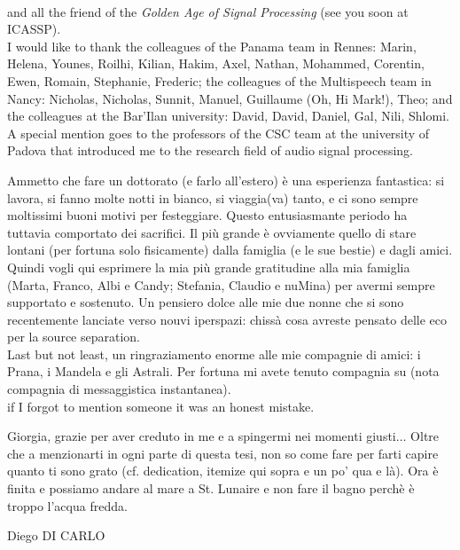 \\and all the friend of the \textit{Golden Age of Signal Processing} (see you soon at ICASSP).
\\I would like to thank the colleagues of the Panama team in Rennes: Marin, Helena, Younes, Roilhi, Kilian, Hakim, Axel, Nathan, Mohammed, Corentin, Ewen, Romain, Stephanie, Frederic;
the colleagues of the Multispeech team in Nancy: Nicholas, Nicholas, Sunnit, Manuel, Guillaume (Oh, Hi Mark!), Theo;
and the colleagues at the Bar'Ilan university: David, David, Daniel, Gal, Nili, Shlomi.
A special mention goes to the professors of the CSC team at the university of Padova that introduced me to the research field of audio signal processing.

\mynewline
Ammetto che fare un dottorato (e farlo all'estero) \`e una esperienza fantastica:
si lavora,
si fanno molte notti in bianco, si viaggia(va) tanto, e ci sono sempre moltissimi buoni motivi per festeggiare.
Questo entusiasmante periodo ha tuttavia comportato dei sacrifici.
Il pi\`u grande \`e ovviamente quello di stare lontani (per fortuna solo fisicamente) dalla famiglia (e le sue bestie) e dagli amici.
Quindi vogli qui esprimere la mia pi\`u grande gratitudine alla mia famiglia (Marta, Franco, Albi e Candy; Stefania, Claudio e nuMina) per avermi sempre supportato e sostenuto.
Un pensiero dolce alle mie due nonne che si sono recentemente lanciate verso nouvi iperspazi: chiss\`a cosa avreste pensato delle eco per la source separation.
\\Last but not least, un ringraziamento enorme alle mie compagnie di amici: i Prana, i Mandela e gli Astrali.
Per fortuna mi avete tenuto compagnia su (nota compagnia di messaggistica instantanea).
\\if I forgot to mention someone it was an honest mistake.

\mynewline
Giorgia, grazie per aver creduto in me e a spingermi nei momenti giusti$\ldots$
Oltre che a menzionarti in ogni parte di questa tesi, non so come fare per farti capire quanto ti sono grato (cf. dedication, itemize qui sopra e un po' qua e l\`a).
Ora \`e finita e possiamo andare al mare a St. Lunaire e non fare il bagno perch\`e \`e troppo l'acqua fredda.

\begin{flushright}
    Diego DI CARLO
\end{flushright}